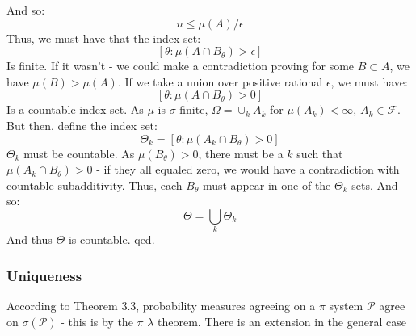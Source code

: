 \documentclass[12pt,a4paper]{article}
\newcommand{\1}[1]{\mathbbm{1}\left\{ #1 \right\}}
\newcommand{\fcal}{\mathcal{F}}
\newcommand{\pcal}{\mathcal{P}}
\begin{document}
And so:
$$
	n \leq \mu(A)/\epsilon
$$
Thus, we must have that the index set:
$$
	\left[\theta: \mu(A \cap B_{\theta}) > \epsilon\right]
$$
Is finite. If it wasn't - we could make a contradiction proving for some $B \subset A$, we have $\mu(B) > \mu(A)$. If we take a union over positive rational $\epsilon$, we must have:
$$
	\left[\theta: \mu(A \cap B_\theta) > 0\right]
$$
Is a countable index set. As $\mu$ is $\sigma$ finite, $\Omega = \cup_k A_k$ for $\mu(A_k) < \infty$, $A_k \in \fcal$. But then, define the index set:
$$
	\Theta_k = \left[\theta: \mu(A_k \cap B_\theta) > 0\right]
$$
$\Theta_k$ must be countable. As $\mu(B_\theta) > 0$, there must be a $k$ such that $\mu(A_k \cap B_\theta) > 0$ - if they all equaled zero, we would have a contradiction with countable subadditivity. Thus, each $B_\theta$ must appear in one of the $\Theta_k$ sets. And so:
$$
	\Theta = \bigcup_k \Theta_k
$$
And thus $\Theta$ is countable. qed.

\subsubsection{Uniqueness} 
According to Theorem 3.3, probability measures agreeing on a $\pi$ system $\pcal$ agree on $\sigma(\pcal)$ - this is by the $\pi$ $\lambda$ theorem. There is an extension in the general case
\end{document}
